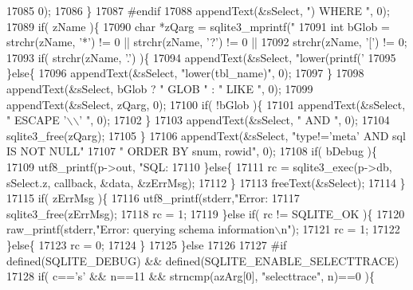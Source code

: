 \begin{DoxyCode}
{{{{{{{{{{{{{{{{{{{{{{{{{{{{{{{{{{{{{{{{{{{{{{{{{{{{{{{{{{{{{{{{{{{{{{{{{{{{{{{17085         0);
17086       \}
17087 \textcolor{preprocessor}{#endif}
17088       appendText(&sSelect, \textcolor{stringliteral}{") WHERE "}, 0);
17089       \textcolor{keywordflow}{if}( zName )\{
17090         \textcolor{keywordtype}{char} *zQarg = sqlite3_mprintf(\textcolor{stringliteral}{"%
17091         \textcolor{keywordtype}{int} bGlob = strchr(zName, \textcolor{charliteral}{'*'}) != 0 || strchr(zName, \textcolor{charliteral}{'?'}) != 0 ||
17092                     strchr(zName, \textcolor{charliteral}{'['}) != 0;
17093         \textcolor{keywordflow}{if}( strchr(zName, \textcolor{charliteral}{'.'}) )\{
17094           appendText(&sSelect, \textcolor{stringliteral}{"lower(printf('%
17095         \}\textcolor{keywordflow}{else}\{
17096           appendText(&sSelect, \textcolor{stringliteral}{"lower(tbl\_name)"}, 0);
17097         \}
17098         appendText(&sSelect, bGlob ? \textcolor{stringliteral}{" GLOB "} : \textcolor{stringliteral}{" LIKE "}, 0);
17099         appendText(&sSelect, zQarg, 0);
17100         \textcolor{keywordflow}{if}( !bGlob )\{
17101           appendText(&sSelect, \textcolor{stringliteral}{" ESCAPE '\(\backslash\)\(\backslash\)' "}, 0);
17102         \}
17103         appendText(&sSelect, \textcolor{stringliteral}{" AND "}, 0);
17104         sqlite3_free(zQarg);
17105       \}
17106       appendText(&sSelect, \textcolor{stringliteral}{"type!='meta' AND sql IS NOT NULL"}
17107                            \textcolor{stringliteral}{" ORDER BY snum, rowid"}, 0);
17108       \textcolor{keywordflow}{if}( bDebug )\{
17109         utf8_printf(p->out, \textcolor{stringliteral}{"SQL: %
17110       \}\textcolor{keywordflow}{else}\{
17111         rc = sqlite3_exec(p->db, sSelect.z, callback, &data, &zErrMsg);
17112       \}
17113       freeText(&sSelect);
17114     \}
17115     \textcolor{keywordflow}{if}( zErrMsg )\{
17116       utf8_printf(stderr,\textcolor{stringliteral}{"Error: %
17117       sqlite3_free(zErrMsg);
17118       rc = 1;
17119     \}\textcolor{keywordflow}{else} \textcolor{keywordflow}{if}( rc != SQLITE_OK )\{
17120       raw_printf(stderr,\textcolor{stringliteral}{"Error: querying schema information\(\backslash\)n"});
17121       rc = 1;
17122     \}\textcolor{keywordflow}{else}\{
17123       rc = 0;
17124     \}
17125   \}\textcolor{keywordflow}{else}
17126 
17127 \textcolor{preprocessor}{#if defined(SQLITE\_DEBUG) && defined(SQLITE\_ENABLE\_SELECTTRACE)}
17128   \textcolor{keywordflow}{if}( c==\textcolor{charliteral}{'s'} && n==11 && strncmp(azArg[0], \textcolor{stringliteral}{"selecttrace"}, n)==0 )\{
}}}}}}}}}}}}}}}}}}}}}}}}}}}}}}}}}}}}}}}}}}}}}}}}}}}}}}}}}}}}}}}}}}}}}}}}}}}}}}}}}}}
\end{DoxyCode}
